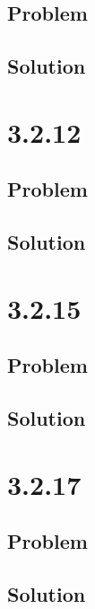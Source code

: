 \documentclass[12pt]{article}
\begin{document}
\subsection*{Problem}

\subsection*{Solution}



\section*{3.2.12}

\subsection*{Problem}

\subsection*{Solution}



\section*{3.2.15}

\subsection*{Problem}

\subsection*{Solution}



\section*{3.2.17}

\subsection*{Problem}

\subsection*{Solution}
\end{document}

